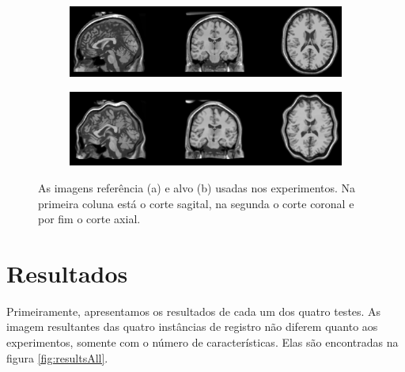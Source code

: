 \begin{figure}[H]
    \centering
    \begin{subfigure}[t]{0.8\textwidth}
      \includegraphics[width=\textwidth]{figuras/referenceImg.png}
      \label{fig:refImg}
    \end{subfigure}
    \begin{subfigure}[t]{0.8\textwidth}
      \includegraphics[width=\textwidth]{figuras/targetImg.png}
      \label{fig:tarImg}
    \end{subfigure}
    \caption{As imagens referência (a) e alvo (b) usadas nos experimentos.
             Na primeira coluna está o corte sagital, na segunda o corte
             coronal e por fim o corte axial.}
    \label{fig:testImg}
\end{figure}

\section{Resultados}

  Primeiramente, apresentamos os resultados de cada um dos quatro testes. As
imagem resultantes das quatro instâncias de registro não diferem quanto aos
experimentos, somente com o número de características. Elas são encontradas
na figura \ref{fig:resultsAll}.

